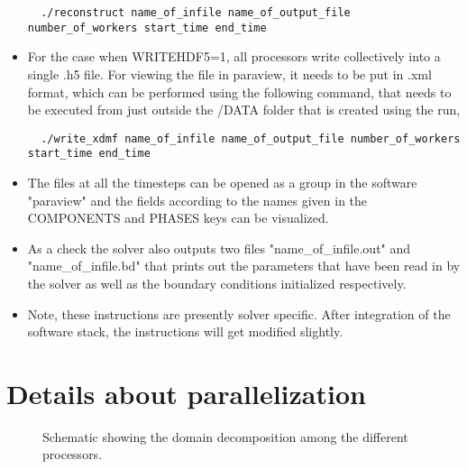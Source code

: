 \documentclass[a4paper,10pt]{article}
\begin{document}
\begin{itemize}
\begin{lstlisting}
  ./reconstruct name_of_infile name_of_output_file number_of_workers start_time end_time 
 \end{lstlisting}
 \item For the case when WRITEHDF5=1, all processors write collectively into a single .h5 file. For viewing the file in 
 paraview, it needs to be put in .xml format, which can be performed using the following command, that needs to be
 executed from just outside the /DATA folder that is created using the run,
 \begin{lstlisting}
  ./write_xdmf name_of_infile name_of_output_file number_of_workers start_time end_time
 \end{lstlisting}
 \item The files at all the timesteps can be opened as a group in the software "paraview" and the fields according to the names given in the COMPONENTS and PHASES keys can be visualized.
 \item As a check the solver also outputs two files "name\_of\_infile.out" and "name\_of\_infile.bd" that prints out the parameters that have been read in by the solver as well as the 
 boundary conditions initialized respectively.
 \item Note, these instructions are presently solver specific. After integration of the software stack, 
 the instructions will get modified slightly.
\end{itemize}

\section{Details about parallelization}
\begin{figure}[!htbp]
\centering
{}
\caption{Schematic showing the domain decomposition among the different processors.}
\label{Domain_decomposition}
\end{figure}
\end{document}
